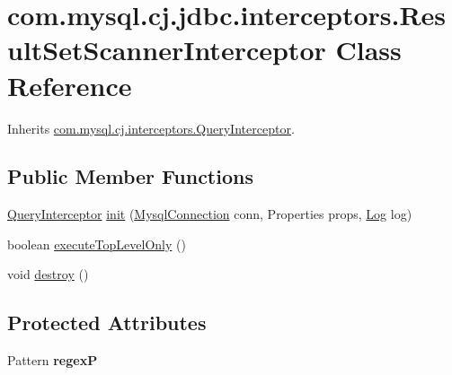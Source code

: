 \hypertarget{classcom_1_1mysql_1_1cj_1_1jdbc_1_1interceptors_1_1_result_set_scanner_interceptor}{}\section{com.\+mysql.\+cj.\+jdbc.\+interceptors.\+Result\+Set\+Scanner\+Interceptor Class Reference}
\label{classcom_1_1mysql_1_1cj_1_1jdbc_1_1interceptors_1_1_result_set_scanner_interceptor}


Inherits \mbox{\hyperlink{interfacecom_1_1mysql_1_1cj_1_1interceptors_1_1_query_interceptor}{com.\+mysql.\+cj.\+interceptors.\+Query\+Interceptor}}.

\subsection*{Public Member Functions}
\begin{DoxyCompactItemize}
\item 
\mbox{\hyperlink{interfacecom_1_1mysql_1_1cj_1_1interceptors_1_1_query_interceptor}{Query\+Interceptor}} \mbox{\hyperlink{classcom_1_1mysql_1_1cj_1_1jdbc_1_1interceptors_1_1_result_set_scanner_interceptor_a8b4dccb5d9c1fd75ed0e04fe50a2c087}{init}} (\mbox{\hyperlink{interfacecom_1_1mysql_1_1cj_1_1_mysql_connection}{Mysql\+Connection}} conn, Properties props, \mbox{\hyperlink{interfacecom_1_1mysql_1_1cj_1_1log_1_1_log}{Log}} log)
\item 
boolean \mbox{\hyperlink{classcom_1_1mysql_1_1cj_1_1jdbc_1_1interceptors_1_1_result_set_scanner_interceptor_a3f3a48cedb6de0c16b6ea146aaff4af0}{execute\+Top\+Level\+Only}} ()
\item 
void \mbox{\hyperlink{classcom_1_1mysql_1_1cj_1_1jdbc_1_1interceptors_1_1_result_set_scanner_interceptor_a6e0fa82b6d4827d34c1db0676419efa5}{destroy}} ()
\end{DoxyCompactItemize}
\subsection*{Protected Attributes}
\begin{DoxyCompactItemize}
\item 
\mbox{\label{classcom_1_1mysql_1_1cj_1_1jdbc_1_1interceptors_1_1_result_set_scanner_interceptor_a1546575c417e1be4a380a9154c1aa05a}} 
Pattern {\bfseries regexP}
\end{DoxyCompactItemize}


